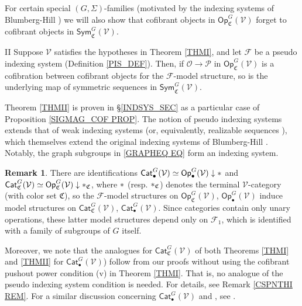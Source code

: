 \documentclass[a4paper,10pt
,draft
]{article}%
\numberwithin{equation}{section}
\numberwithin{figure}{section}
\theoremstyle{definition} %
\newtheorem{remark}[equation]{Remark}%
\newcommand{\Sym}{\ensuremath{\mathsf{Sym}}}%
\newcommand{\Cat}{\mathsf{Cat}}
\newcommand{\Op}{\mathsf{Op}}%
\newcommand{\F}{\ensuremath{\mathcal F}}
\newcommand{\V}{\ensuremath{\mathcal V}}
\renewcommand{\O}{\ensuremath{\mathcal O}}
\newcommand{\1}{\ensuremath{\mathbbm 1}}%
\begin{document}
For certain special $(G,\Sigma)$-families
(motivated by the indexing systems of Blumberg-Hill \cite{BH15})
we will also show that cofibrant objects in 
$\Op^G_{\mathfrak C}(\V)$
forget to cofibrant objects in 
$\mathsf{Sym}^G_{\mathfrak C}(\V)$.


\begin{customthm}{II}\label{THMII}
	Suppose $\V$ satisfies the hypotheses in Theorem \ref{THMI},
	and let $\F$ be a pseudo indexing system (Definition \ref{PIS_DEF}).
	Then, if $\O \to \mathcal{P}$ in $\Op^G_{\mathfrak{C}}(\V)$ is a cofibration between cofibrant objects for the $\F$-model structure,
	so is the underlying
	map of symmetric sequences in $\Sym^G_{\mathfrak{C}}(\V)$.
\end{customthm}


Theorem \ref{THMII} is proven in \S \ref{INDSYS_SEC}
as a particular case of Proposition \ref{SIGMAG_COF PROP}.
The notion of pseudo indexing systems
extends that of weak indexing systems \cite[Def. 4.49]{BP_geo}
(or, equivalently, realizable sequences \cite[Def. 4.6]{GW18}),
which themselves extend the original 
indexing systems of Blumberg-Hill \cite{BH15}.
Notably, the graph subgroups in \eqref{GRAPHEQ EQ} form an indexing system.



\begin{remark}\label{RESTTOCATS REM}
	There are identifications
	$\Cat_\bullet^G(\V) \simeq \Op_\bullet^G(\V) \downarrow \**$ and
	$\Cat_{\mathfrak C}^G(\V) \simeq \Op_{\mathfrak C}^G(\V) \downarrow \**_{\mathfrak C}$,
	where $\**$ (resp. $\**_{\mathfrak C}$) denotes the terminal $\V$-category (with color set $\mathfrak C$),
	so the $\F$-model structures on $\Op_{\mathfrak C}^G(\V)$, $\Op_\bullet^G(\V)$
	induce model structures on $\Cat_{\mathfrak C}^G(\V)$, $\Cat_\bullet^G(\V)$.
	Since categories contain only unary operations,
	these latter model structures depend only on $\F_1$,
	which is identified with a family of subgroups of $G$ itself.

	Moreover, we note that the analogues 
	for $\Cat_{\mathfrak C}^G(\V)$
	of both Theorems \ref{THMI} and \ref{THMII}
	for $\Cat_\bullet^G(\V)$)
	follow from our proofs without using
	the cofibrant pushout power condition (v)
	in Theorem \ref{THMI}.
	That is, no analogue of the pseudo indexing system condition  is needed.
	For details, see Remark \ref{CSPNTHI REM}.
	For a similar discussion concerning
	$\Cat_\bullet^G(\V)$ and
	\cite[Thm. \ref{AC-THMA}]{BP_ACOP},
	see \cite[Rem. \ref{AC-RESTTOCATS REM}]{BP_ACOP}.
\end{remark}
\end{document}
